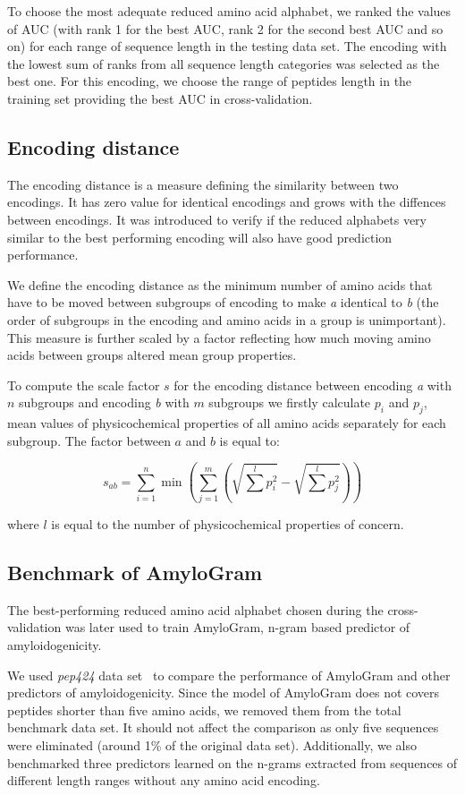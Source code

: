 \documentclass{bioinfo}
\begin{document}
\begin{methods}
  To choose the most adequate reduced amino acid alphabet, we ranked the values 
of AUC (with rank 1 for the best AUC, rank 2 for the second best AUC and so on) 
for each range of sequence length in the testing data set. The encoding with 
the lowest sum of ranks from all sequence length categories was selected as 
the best one. For this encoding, we choose the range of peptides length in the 
training set providing the best AUC in cross-validation.

\subsection{Encoding distance}
The encoding distance is a measure defining the similarity between two 
encodings. It has zero value for identical encodings and grows with the 
diffences between encodings. It was introduced to verify if the reduced 
alphabets very similar to the best performing encoding will also have good 
prediction performance.

  We define the encoding distance as the minimum number of amino acids that 
have to be moved between subgroups of encoding to make \textit{a} identical to 
\textit{b} (the order of subgroups in the encoding and amino acids in a group 
is unimportant). This measure is further scaled by a factor reflecting how 
much moving amino acids between groups altered mean group properties. 

To compute the scale factor $s$ for the encoding distance between 
encoding \textit{a} with $n$ subgroups and encoding \textit{b} with $m$ 
subgroups we firstly calculate $p_i$ and $p_j$, mean values of physicochemical 
properties of all amino acids separately for each subgroup. The factor between 
$a$ and $b$ is equal to: 

$$
s_{ab} = \sum^n_{i = 1} \min \left( \sum^m_{j = 1} \left(\sqrt{\sum^l p_{i}^2} 
- \sqrt{\sum^l p_{j}^2} \right) \right)
$$
 
where $l$ is equal to the number of physicochemical properties of concern.

\subsection{Benchmark of AmyloGram}

The best-performing reduced amino acid alphabet chosen during the 
cross-validation was later used to train AmyloGram, n-gram based predictor of 
amyloidogenicity.

  We used \textit{pep424} data set~\citep{walsh_pasta_2014} to compare the 
performance of AmyloGram and other predictors of amyloidogenicity. Since the 
model of AmyloGram does not covers peptides shorter than five amino acids, we 
removed them from the total benchmark data set. It should not affect the 
comparison as only five sequences were eliminated (around 1\% of the original 
data set). Additionally, we also benchmarked three predictors learned on the 
n-grams extracted from sequences of different length ranges without any amino 
acid encoding.


\end{methods}
\end{document}
